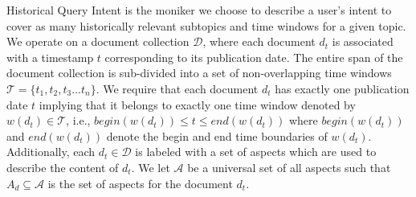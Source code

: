 


Historical Query Intent is the moniker we choose to describe a user's intent to cover as many historically relevant subtopics and time windows for a given topic. We operate on a document collection $\mathcal{D}$, where each document $d_t$ is associated with a timestamp $t$ corresponding to its publication date. The entire span of the document collection is sub-divided into a set of non-overlapping time windows $\mathcal{T} = \{t_1,t_2,t_3 ... t_n \}$. We require that each document $d_t$ has exactly one publication date $t$ implying that it belongs to exactly one time window denoted by $w(d_t) \in \mathcal{T}$, i.e., $begin(w(d_t)) \leq t \leq end(w(d_t))$ where $begin(w(d_t))$ and $end(w(d_t))$ denote the begin and end time boundaries of $w(d_t)$. Additionally, each $d_t \in \mathcal{D}$ is labeled with a set of aspects which are used to describe the content of $d_t$. We let $\mathcal{A}$ be a universal set of all aspects such that $A_d \subseteq \mathcal{A}$ is the set of aspects for the document $d_t$. 


